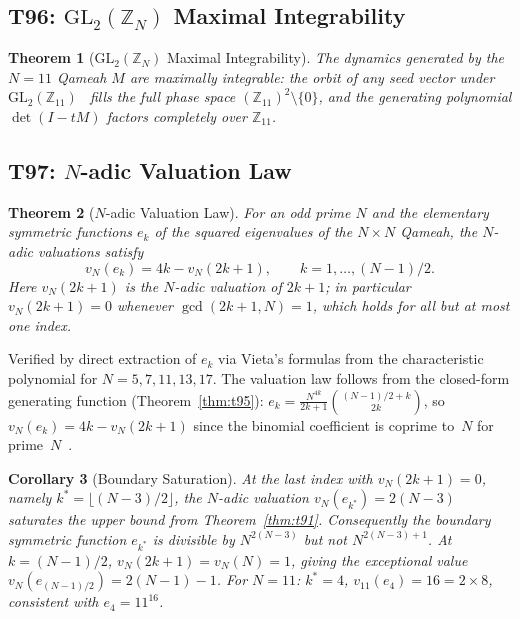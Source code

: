 \documentclass[aip,jmp,reprint,superscriptaddress,floatfix,nofootinbib]{revtex4-2}
\newtheorem{theorem}{Theorem}
\newtheorem{corollary}[theorem]{Corollary}
\theoremstyle{definition}
\theoremstyle{remark}
\begin{document}
\subsection{T96: \texorpdfstring{$\mathrm{GL}_2(\mathbb{Z}_N)$}{GL\_2(Z\_N)} Maximal Integrability}
\label{sec:t96-gl2-integrability}

\begin{theorem}[$\mathrm{GL}_2(\mathbb{Z}_N)$ Maximal Integrability]
\label{thm:t96}
The dynamics generated by the $N{=}11$ Qameah $M$
are maximally integrable: the orbit of any seed vector under
$\mathrm{GL}_2(\mathbb{Z}_{11})$~\cite{appleby} fills the full phase space $(\mathbb{Z}_{11})^2\setminus\{0\}$,
and the generating polynomial $\det(I - tM)$ factors completely over $\mathbb{Z}_{11}$.
\end{theorem}

\subsection{T97: \texorpdfstring{$N$}{N}-adic Valuation Law}
\label{sec:t97-nadic-valuation}

\begin{theorem}[$N$-adic Valuation Law]
\label{thm:t97}
For an odd prime $N$ and the elementary symmetric functions $e_k$ of the
squared eigenvalues of the $N{\times}N$ Qameah, the $N$-adic
valuations satisfy
\[
  v_N(e_k) = 4k - v_N(2k+1), \qquad k = 1,\ldots,(N{-}1)/2.
\]
Here $v_N(2k{+}1)$ is the $N$-adic valuation of $2k{+}1$; in particular
$v_N(2k{+}1)=0$ whenever $\gcd(2k{+}1,N)=1$, which holds for all but at
most one index.
\end{theorem}

Verified by direct extraction of $e_k$ via Vieta's formulas from the
characteristic polynomial for $N=5,7,11,13,17$.  The valuation law
follows from the closed-form generating function
(Theorem~\ref{thm:t95}): $e_k = \frac{N^{4k}}{2k+1}\binom{(N-1)/2+k}{2k}$,
so $v_N(e_k) = 4k - v_N(2k{+}1)$ since the binomial coefficient is
coprime to~$N$ for prime~$N$~\cite{washington}.

\begin{corollary}[Boundary Saturation]
\label{cor:t97-boundary}
At the last index with $v_N(2k+1)=0$, namely
$k^* = \lfloor(N-3)/2\rfloor$, the $N$-adic valuation
$v_N(e_{k^*}) = 2(N-3)$ saturates the upper bound from
Theorem~\ref{thm:t91}.  Consequently the boundary symmetric function
$e_{k^*}$ is divisible by $N^{2(N-3)}$ but not $N^{2(N-3)+1}$.
At $k=(N{-}1)/2$, $v_N(2k+1) = v_N(N) = 1$, giving the exceptional
value $v_N(e_{(N-1)/2}) = 2(N{-}1)-1$.
For $N=11$: $k^*=4$, $v_{11}(e_4)=16=2\times 8$, consistent with
$e_4=11^{16}$.
\end{corollary}
\end{document}
